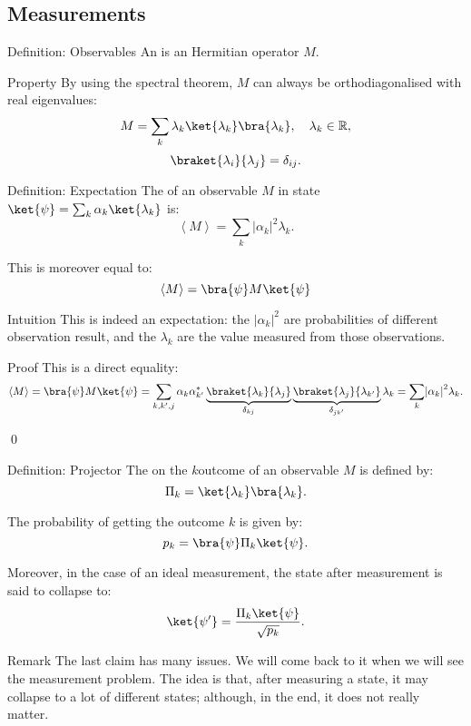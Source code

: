 \documentclass[a4paper]{article}
\begin{document}
\subsection{Measurements}

\begin{parag}{Definition: Observables}
    An  is an Hermitian operator $M$.

    \begin{subparag}{Property}
        By using the spectral theorem, $M$ can always be orthodiagonalised with real eigenvalues: 
        \[M = \sum_{k} \lambda_k \ket{\lambda_k} \bra{\lambda_k}, \mathspace \lambda_k \in \mathbb{R},\]
        \[\braket{\lambda_i}{\lambda_j} = \delta_{ij}.\]
    \end{subparag}
\end{parag}

\begin{parag}{Definition: Expectation}
    The  of an observable $M$ in state $\ket{\psi} = \sum_{k} \alpha_k \ket{\lambda_k}$ is: 
    \[\left\langle M \right\rangle = \sum_{k} \left|\alpha_k\right|^2 \lambda_k.\]

    This is moreover equal to: 
    \[\left\langle M \right\rangle = \bra{\psi}M \ket{\psi}\]

    \begin{subparag}{Intuition}
        This is indeed an expectation: the $\left|\alpha_k\right|^2$ are probabilities of different observation result, and the $\lambda_k$ are the value measured from those observations.
    \end{subparag}
    
    \begin{subparag}{Proof}
        This is a direct equality:
        \[\left\langle M \right\rangle = \bra{\psi}M \ket{\psi} = \sum_{k, k', j} \alpha_k \alpha_{k'}^* \underbrace{\braket{\lambda_k}{\lambda_j}}_{\delta_{kj}} \underbrace{\braket{\lambda_j}{\lambda_{k'}}}_{\delta_{j k'}}\lambda_k = \sum_{k} \left|\alpha_k\right|^2 \lambda_k.\]

        \qed
    \end{subparag}
\end{parag}

\begin{parag}{Definition: Projector}
    The  on the $k$\Th outcome of an observable $M$ is defined by: 
    \[\Pi_k = \ket{\lambda_k}\bra{\lambda_k}.\]

    The probability of getting the outcome $k$ is given by: 
    \[p_k = \bra{\psi} \Pi_k \ket{\psi}.\]

    Moreover, in the case of an ideal measurement, the state after measurement is said to collapse to: 
    \[\ket{\psi'} = \frac{\Pi_k \ket{\psi}}{\sqrt{p_k}}.\]

    \begin{subparag}{Remark}
        The last claim has many issues. We will come back to it when we will see the measurement problem. The idea is that, after measuring a state, it may collapse to a lot of different states; although, in the end, it does not really matter.
    \end{subparag}
\end{parag}
\end{document}
